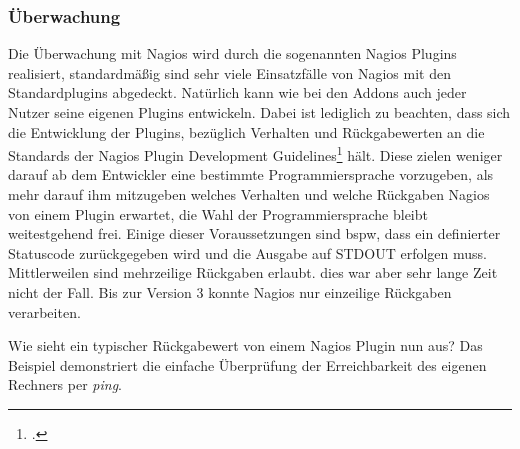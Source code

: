 \documentclass[12pt,a4paper,parskip,listof=totoc,bibliography=totoc]{scrreprt}
\begin{document}
	\subsubsection{Überwachung}
	Die Überwachung mit Nagios wird durch die sogenannten Nagios Plugins realisiert, standardmäßig sind sehr viele Einsatzfälle von Nagios mit den Standardplugins abgedeckt. Natürlich kann wie bei den Addons auch jeder Nutzer seine eigenen Plugins entwickeln. Dabei ist lediglich zu beachten, dass sich die Entwicklung der Plugins, bezüglich Verhalten und Rückgabewerten an die Standards der \glqq Nagios Plugin Development Guidelines\grqq\footcite{nagiospluginguidelines} hält. Diese zielen weniger darauf ab dem Entwickler eine bestimmte Programmiersprache vorzugeben, als mehr darauf ihm mitzugeben welches Verhalten und welche Rückgaben Nagios von einem Plugin erwartet, die Wahl der Programmiersprache bleibt weitestgehend frei. Einige dieser Voraussetzungen sind \acrlong{bspw}, dass ein definierter Statuscode zurückgegeben wird und die Ausgabe auf STDOUT erfolgen muss. Mittlerweilen sind mehrzeilige Rückgaben erlaubt. dies war aber sehr lange Zeit nicht der Fall. Bis zur Version 3 konnte Nagios nur einzeilige Rückgaben verarbeiten.
	
	Wie sieht ein typischer Rückgabewert von einem Nagios Plugin nun aus? Das Beispiel demonstriert die einfache Überprüfung der Erreichbarkeit des eigenen Rechners per \textit{ping}.\medskip
	
\end{document}
